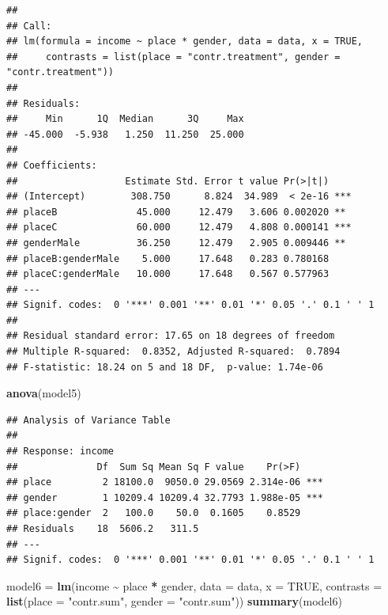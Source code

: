\documentclass[
]{article}
\newenvironment{Shaded}{\begin{snugshade}}{\end{snugshade}}
\newcommand{\AttributeTok}[1]{\textcolor[rgb]{0.13,0.29,0.53}{#1}}
\newcommand{\ConstantTok}[1]{\textcolor[rgb]{0.56,0.35,0.01}{#1}}
\newcommand{\FunctionTok}[1]{\textcolor[rgb]{0.13,0.29,0.53}{\textbf{#1}}}
\newcommand{\NormalTok}[1]{#1}
\newcommand{\OtherTok}[1]{\textcolor[rgb]{0.56,0.35,0.01}{#1}}
\newcommand{\SpecialCharTok}[1]{\textcolor[rgb]{0.81,0.36,0.00}{\textbf{#1}}}
\newcommand{\StringTok}[1]{\textcolor[rgb]{0.31,0.60,0.02}{#1}}
\begin{document}
\begin{verbatim}
## 
## Call:
## lm(formula = income ~ place * gender, data = data, x = TRUE, 
##     contrasts = list(place = "contr.treatment", gender = "contr.treatment"))
## 
## Residuals:
##     Min      1Q  Median      3Q     Max 
## -45.000  -5.938   1.250  11.250  25.000 
## 
## Coefficients:
##                   Estimate Std. Error t value Pr(>|t|)    
## (Intercept)        308.750      8.824  34.989  < 2e-16 ***
## placeB              45.000     12.479   3.606 0.002020 ** 
## placeC              60.000     12.479   4.808 0.000141 ***
## genderMale          36.250     12.479   2.905 0.009446 ** 
## placeB:genderMale    5.000     17.648   0.283 0.780168    
## placeC:genderMale   10.000     17.648   0.567 0.577963    
## ---
## Signif. codes:  0 '***' 0.001 '**' 0.01 '*' 0.05 '.' 0.1 ' ' 1
## 
## Residual standard error: 17.65 on 18 degrees of freedom
## Multiple R-squared:  0.8352, Adjusted R-squared:  0.7894 
## F-statistic: 18.24 on 5 and 18 DF,  p-value: 1.74e-06
\end{verbatim}

\begin{Shaded}
\begin{Highlighting}[]
\FunctionTok{anova}\NormalTok{(model5)}
\end{Highlighting}
\end{Shaded}

\begin{verbatim}
## Analysis of Variance Table
## 
## Response: income
##              Df  Sum Sq Mean Sq F value    Pr(>F)    
## place         2 18100.0  9050.0 29.0569 2.314e-06 ***
## gender        1 10209.4 10209.4 32.7793 1.988e-05 ***
## place:gender  2   100.0    50.0  0.1605    0.8529    
## Residuals    18  5606.2   311.5                      
## ---
## Signif. codes:  0 '***' 0.001 '**' 0.01 '*' 0.05 '.' 0.1 ' ' 1
\end{verbatim}

\begin{Shaded}
\begin{Highlighting}[]
\NormalTok{model6 }\OtherTok{=} \FunctionTok{lm}\NormalTok{(income }\SpecialCharTok{\textasciitilde{}}\NormalTok{ place }\SpecialCharTok{*}\NormalTok{ gender, }\AttributeTok{data =}\NormalTok{ data, }\AttributeTok{x =} \ConstantTok{TRUE}\NormalTok{, }\AttributeTok{contrasts =} \FunctionTok{list}\NormalTok{(}\AttributeTok{place =} \StringTok{"contr.sum"}\NormalTok{,}
    \AttributeTok{gender =} \StringTok{"contr.sum"}\NormalTok{))}
\FunctionTok{summary}\NormalTok{(model6)}
\end{Highlighting}
\end{Shaded}
\end{document}
